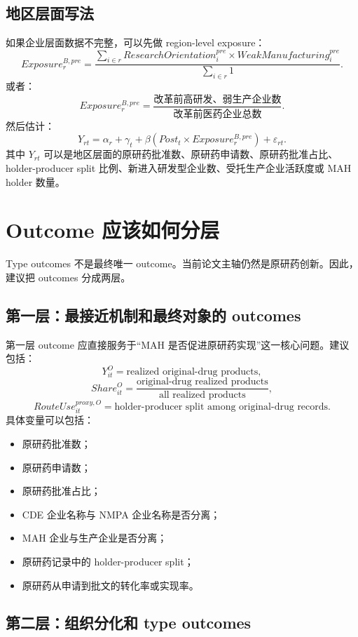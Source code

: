 \documentclass[12pt]{ctexart}
\begin{document}
\subsection{地区层面写法}

如果企业层面数据不完整，可以先做 region-level exposure：
\[
Exposure_r^{B,pre}=\frac{\sum_{i\in r}ResearchOrientation_i^{pre}\times WeakManufacturing_i^{pre}}{\sum_{i\in r}1}.
\]
或者：
\[
Exposure_r^{B,pre}=\frac{\text{改革前高研发、弱生产企业数}}{\text{改革前医药企业总数}}.
\]
然后估计：
\[
Y_{rt}=\alpha_r+\gamma_t+\beta\left(Post_t\times Exposure_r^{B,pre}\right)+\varepsilon_{rt}.
\]
其中 $Y_{rt}$ 可以是地区层面的原研药批准数、原研药申请数、原研药批准占比、holder-producer split 比例、新进入研发型企业数、受托生产企业活跃度或 MAH holder 数量。

\section{Outcome 应该如何分层}

Type outcomes 不是最终唯一 outcome。当前论文主轴仍然是原研药创新。因此，建议把 outcomes 分成两层。

\subsection{第一层：最接近机制和最终对象的 outcomes}

第一层 outcome 应直接服务于“MAH 是否促进原研药实现”这一核心问题。建议包括：
\[
Y_{it}^{O}=\text{realized original-drug products},
\]
\[
Share_{it}^{O}=\frac{\text{original-drug realized products}}{\text{all realized products}},
\]
\[
RouteUse_{it}^{proxy,O}=\text{holder-producer split among original-drug records}.
\]
具体变量可以包括：
\begin{itemize}
    \item 原研药批准数；
    \item 原研药申请数；
    \item 原研药批准占比；
    \item CDE 企业名称与 NMPA 企业名称是否分离；
    \item MAH 企业与生产企业是否分离；
    \item 原研药记录中的 holder-producer split；
    \item 原研药从申请到批文的转化率或实现率。
\end{itemize}

\subsection{第二层：组织分化和 type outcomes}
\end{document}
